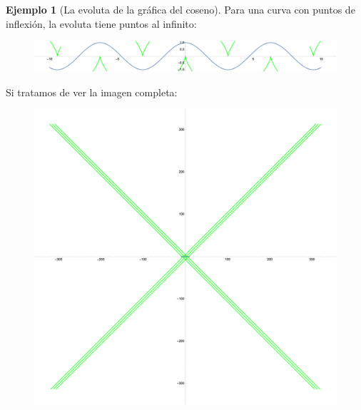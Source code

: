 \documentclass[spanish]{book}
\theoremstyle{definition}
\newtheorem*{ejem}{Ejemplo}
\begin{document}
\begin{ejem}[La evoluta de la gráfica del coseno]
	Para una curva con puntos de inflexión, la evoluta tiene puntos al infinito:
	\begin{figure}[H]
		\centering
		\includegraphics[width=0.8\linewidth]{curvas6}
	\end{figure}
	Si tratamos de ver la imagen completa:
	\begin{figure}[H]
		\centering
		\includegraphics[width=0.9\linewidth]{curvas7}
	\end{figure}
\end{ejem}
\end{document}
